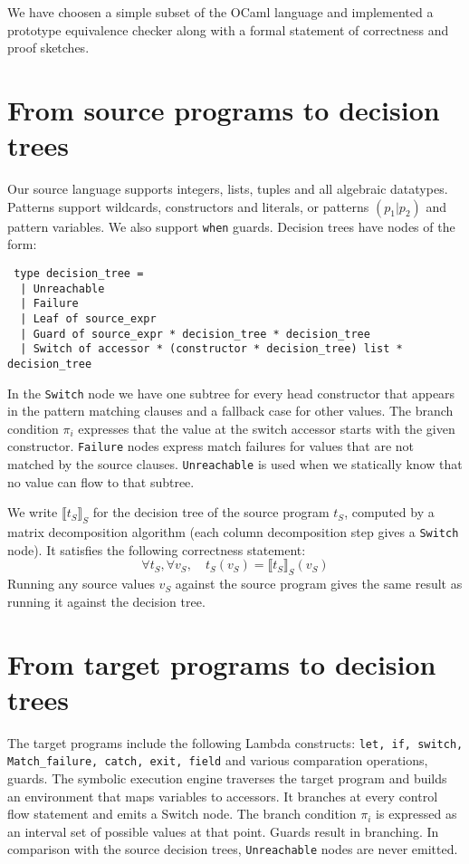 \documentclass[12pt]{article}
\newcommand{\sem}[1]{{\llbracket{#1}\rrbracket}}
\begin{document}
We have choosen a simple subset of the OCaml language and implemented a
prototype equivalence checker along with a formal statement of
correctness and proof sketches.

\section{From source programs to decision trees}
Our source language supports integers, lists, tuples and all algebraic
datatypes. Patterns support wildcards, constructors and literals, or
patterns $(p_1|p_2)$ and pattern variables.
We also support \texttt{when} guards.
Decision trees have nodes of the form:
\begin{lstlisting}
 type decision_tree =
  | Unreachable
  | Failure
  | Leaf of source_expr
  | Guard of source_expr * decision_tree * decision_tree
  | Switch of accessor * (constructor * decision_tree) list * decision_tree
\end{lstlisting}
In the \texttt{Switch} node we have one subtree for every head constructor
that appears in the pattern matching clauses and a fallback case for
other values. The branch condition $\pi_i$ expresses that the value at the
switch accessor starts with the given constructor.
\texttt{Failure} nodes express match failures for values that are not
matched by the source clauses.
\texttt{Unreachable} is used when we statically know that no value
can flow to that subtree.

We write $\sem{t_S}_S$ for the decision tree of the source program
$t_S$, computed by a matrix decomposition algorithm (each column
decomposition step gives a \texttt{Switch} node).
It satisfies the following correctness statement:
\[
\forall t_S, \forall v_S, \quad t_S(v_S) = \sem{t_S}_S(v_S)
\]
Running any source values $v_S$ against the source program gives the
same result as running it against the decision tree.

\section{From target programs to decision trees}
The target programs include the following Lambda constructs:
\texttt{let, if, switch, Match\_failure, catch, exit, field} and
various comparation operations, guards. The symbolic execution engine
traverses the target program and builds an environment that maps
variables to accessors. It branches at every control flow statement
and emits a Switch node. The branch condition $\pi_i$ is expressed as
an interval set of possible values at that point.
Guards result in branching. In comparison with the source decision
trees, \texttt{Unreachable} nodes are never emitted.
\end{document}
